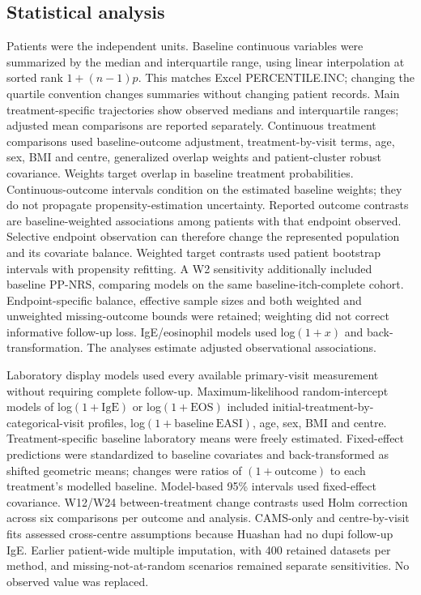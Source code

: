 \subsection{Statistical analysis}
Patients were the independent units. Baseline continuous variables were summarized by the median and interquartile range, using linear interpolation at sorted rank $1+(n-1)p$. This matches Excel PERCENTILE.INC; changing the quartile convention changes summaries without changing patient records. Main treatment-specific trajectories show observed medians and interquartile ranges; adjusted mean comparisons are reported separately. Continuous treatment comparisons used baseline-outcome adjustment, treatment-by-visit terms, age, sex, BMI and centre, generalized overlap weights and patient-cluster robust covariance. Weights target overlap in baseline treatment probabilities. Continuous-outcome intervals condition on the estimated baseline weights; they do not propagate propensity-estimation uncertainty. Reported outcome contrasts are baseline-weighted associations among patients with that endpoint observed. Selective endpoint observation can therefore change the represented population and its covariate balance.\citep{lili2019} Weighted target contrasts used patient bootstrap intervals with propensity refitting. A W2 sensitivity additionally included baseline PP-NRS, comparing models on the same baseline-itch-complete cohort. Endpoint-specific balance, effective sample sizes and both weighted and unweighted missing-outcome bounds were retained; weighting did not correct informative follow-up loss. IgE/eosinophil models used log$(1+x)$ and back-transformation. The analyses estimate adjusted observational associations.

Laboratory display models used every available primary-visit measurement without requiring complete follow-up. Maximum-likelihood random-intercept models of log$(1+\mathrm{IgE})$ or log$(1+\mathrm{EOS})$ included initial-treatment-by-categorical-visit profiles, log$(1+\mathrm{baseline\ EASI})$, age, sex, BMI and centre. Treatment-specific baseline laboratory means were freely estimated. Fixed-effect predictions were standardized to baseline covariates and back-transformed as shifted geometric means; changes were ratios of $(1+\mathrm{outcome})$ to each treatment's modelled baseline. Model-based 95\% intervals used fixed-effect covariance. W12/W24 between-treatment change contrasts used Holm correction across six comparisons per outcome and analysis. CAMS-only and centre-by-visit fits assessed cross-centre assumptions because Huashan had no dupi follow-up IgE. Earlier patient-wide multiple imputation, with 400 retained datasets per method, and missing-not-at-random scenarios remained separate sensitivities. No observed value was replaced.\citep{sterne2009mi,wijesuriya2025longitudinal}

